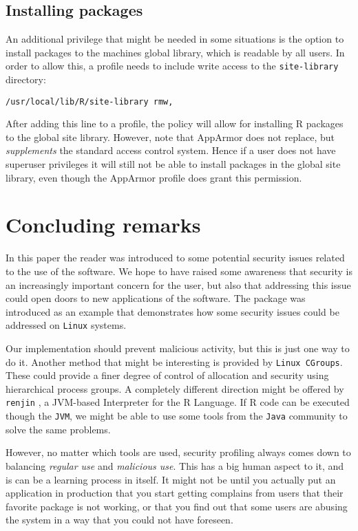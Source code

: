 \documentclass[article]{jss}
\begin{document}
\subsection{Installing packages}

An additional privilege that might be needed in some situations is the option to
install packages to the machines global library, which is readable by all users.
In order to allow this, a profile needs to include write access to the
\texttt{site-library} directory:

\begin{verbatim}
/usr/local/lib/R/site-library rmw,
\end{verbatim}

After adding this line to a profile, the policy will allow for installing R
packages to the global site library. However, note that AppArmor does not
replace, but \emph{supplements} the standard access control system. Hence if a
user does not have superuser privileges it will still not be able to install
packages in the global site library, even though the AppArmor profile does grant
this permission.

\newpage
\section{Concluding remarks}

In this paper the reader was introduced to some potential security issues
related to the use of the  software. We hope to have raised some
awareness that security is an increasingly important concern for the
 user, but also that addressing this issue could open doors to new
applications of the software. The  package was introduced as an
example that demonstrates how some security issues could be addressed on
\texttt{Linux} systems.

Our implementation should prevent malicious activity, but this is just one way
to do it. Another method that might be interesting is provided by 
\texttt{Linux CGroups}. These could provide a finer degree of control of allocation and security using
hierarchical process groups. A completely different direction might be offered
by \texttt{renjin} \citep{renjin}, a JVM-based Interpreter for the R Language.
If R code can be executed though the \texttt{JVM}, we might be able to use some
tools from the \texttt{Java} community to solve the same problems.

However, no matter which tools are used, security profiling always comes down to
balancing \emph{regular use} and \emph{malicious use}. This has a big human aspect to it, and is can be a
learning process in itself. It might not be until you actually put an application in
production that you start getting complains from users that their favorite
package is not working, or that you find out that some users are abusing the
system in a way that you could not have foreseen. 
\end{document}
